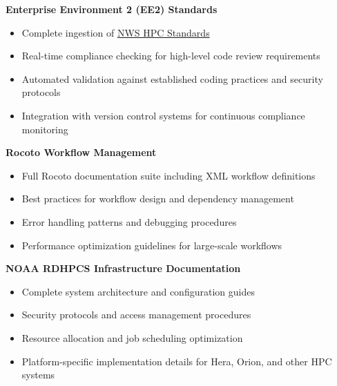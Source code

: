\documentclass[11pt,letterpaper]{article}
\begin{document}
\begin{center}
\end{center}

\textbf{Enterprise Environment 2 (EE2) Standards}
\begin{itemize}
    \item Complete ingestion of \href{https://nws-hpc-standards.readthedocs.io/en/latest/standards.html}{NWS HPC Standards}
    \item Real-time compliance checking for high-level code review requirements
    \item Automated validation against established coding practices and security protocols
    \item Integration with version control systems for continuous compliance monitoring
\end{itemize}

\textbf{Rocoto Workflow Management}
\begin{itemize}
    \item Full Rocoto documentation suite including XML workflow definitions
    \item Best practices for workflow design and dependency management
    \item Error handling patterns and debugging procedures
    \item Performance optimization guidelines for large-scale workflows
\end{itemize}

\textbf{NOAA RDHPCS Infrastructure Documentation}
\begin{itemize}
    \item Complete system architecture and configuration guides
    \item Security protocols and access management procedures
    \item Resource allocation and job scheduling optimization
    \item Platform-specific implementation details for Hera, Orion, and other HPC systems
\end{itemize}
\end{document}

